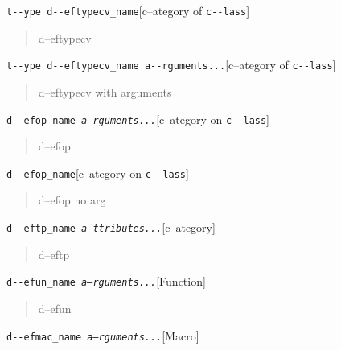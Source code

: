 \documentclass{book}
\begin{document}
\begin{titlepage}
\noindent\texttt{t{-}{-}ype d{-}{-}eftypecv\_name}\hfill[c--ategory of \texttt{c{-}{-}lass}]

%
\begin{quote}
\unskip{\parskip=0pt\noindent}%
d--eftypecv
\end{quote}

\noindent\texttt{t{-}{-}ype d{-}{-}eftypecv\_name a{-}{-}rguments...}\hfill[c--ategory of \texttt{c{-}{-}lass}]

%
\begin{quote}
\unskip{\parskip=0pt\noindent}%
d--eftypecv with arguments
\end{quote}

\noindent\texttt{d{-}{-}efop\_name \EmbracOn{}\textnormal{\textsl{a--rguments...}}\EmbracOff{}}\hfill[c--ategory on \texttt{c{-}{-}lass}]

%
\begin{quote}
\unskip{\parskip=0pt\noindent}%
d--efop
\end{quote}

\noindent\texttt{d{-}{-}efop\_name}\hfill[c--ategory on \texttt{c{-}{-}lass}]

%
\begin{quote}
\unskip{\parskip=0pt\noindent}%
d--efop no arg
\end{quote}

\noindent\texttt{d{-}{-}eftp\_name \EmbracOn{}\textnormal{\textsl{a--ttributes...}}\EmbracOff{}}\hfill[c--ategory]

%
\begin{quote}
\unskip{\parskip=0pt\noindent}%
d--eftp
\end{quote}

\noindent\texttt{d{-}{-}efun\_name \EmbracOn{}\textnormal{\textsl{a--rguments...}}\EmbracOff{}}\hfill[Function]

%
\begin{quote}
\unskip{\parskip=0pt\noindent}%
d--efun
\end{quote}

\noindent\texttt{d{-}{-}efmac\_name \EmbracOn{}\textnormal{\textsl{a--rguments...}}\EmbracOff{}}\hfill[Macro]


\end{titlepage}
\end{document}
